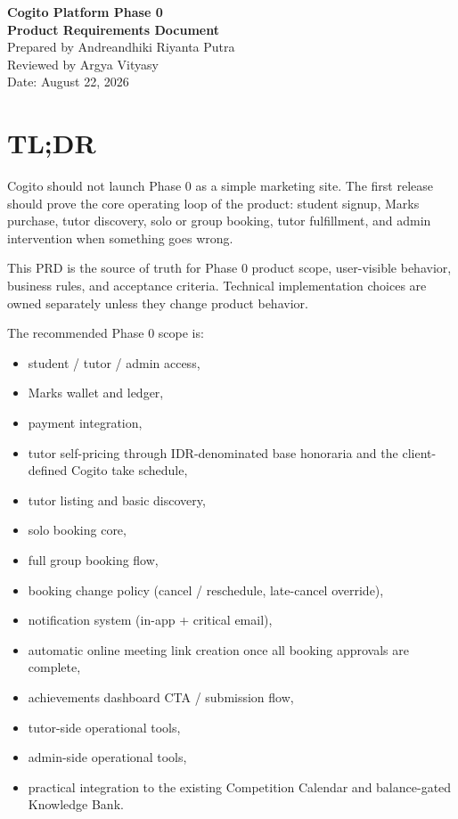 \documentclass[11pt,a4paper]{article}
\begin{document}
\begin{center}
	{\LARGE \textbf{Cogito Platform Phase 0}}\\[4pt]
	{\Large \textbf{Product Requirements Document}}\\[8pt]
	{\normalsize Prepared by Andreandhiki Riyanta Putra}\\
	{\normalsize Reviewed by Argya Vityasy}\\
	{\normalsize Date: August 22, 2026}
\end{center}

\vspace{1em}

\section*{TL;DR}
Cogito should not launch Phase 0 as a simple marketing site. The first release should prove the core operating loop of the product: student signup, Marks purchase, tutor discovery, solo or group booking, tutor fulfillment, and admin intervention when something goes wrong.

This PRD is the source of truth for Phase 0 product scope, user-visible behavior, business rules, and acceptance criteria. Technical implementation choices are owned separately unless they change product behavior.

The recommended Phase 0 scope is:
\begin{itemize}
	\item student / tutor / admin access,
	\item Marks wallet and ledger,
	\item payment integration,
	\item tutor self-pricing through IDR-denominated base honoraria and the client-defined Cogito take schedule,
	\item tutor listing and basic discovery,
	\item solo booking core,
	\item full group booking flow,
	\item booking change policy (cancel / reschedule, late-cancel override),
	\item notification system (in-app + critical email),
	\item automatic online meeting link creation once all booking approvals are complete,
	\item achievements dashboard CTA / submission flow,
	\item tutor-side operational tools,
	\item admin-side operational tools,
	\item practical integration to the existing Competition Calendar and balance-gated Knowledge Bank.
\end{itemize}
\end{document}
